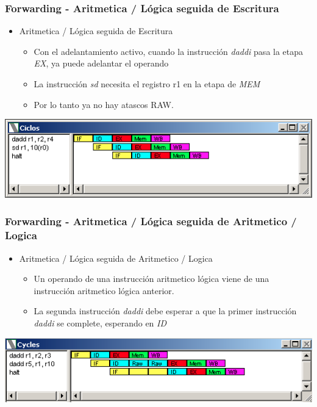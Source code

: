 \documentclass{beamer}
\begin{document}
\begin{frame}[fragile]
\frametitle{Forwarding - Aritmetica / Lógica seguida de Escritura}
\begin{itemize}
\item Aritmetica / Lógica seguida de Escritura
\begin{itemize}
\item Con el adelantamiento activo, cuando la instrucción \emph{daddi} pasa la etapa \emph{EX}, ya puede adelantar el operando
\item La instrucción \emph{sd} necesita el registro r1 en la etapa de \emph{MEM}
\item Por lo tanto ya no hay atascos RAW.
\end{itemize}
\end{itemize}
\includegraphics[scale=0.45]{forwarding-4-aritmetica-escritura.png}
\end{frame}

\begin{frame}[fragile]
\frametitle{Forwarding - Aritmetica / Lógica seguida de Aritmetico / Logica}
\begin{itemize}
\item Aritmetica / Lógica seguida de Aritmetico / Logica
\begin{itemize}
\item Un operando de una instrucción aritmetico lógica viene de una instrucción aritmetico lógica anterior.
\item La segunda  instrucción \emph{daddi} debe esperar a que la primer instrucción \emph{daddi} se complete, esperando en \emph{ID}
\end{itemize}
\end{itemize}
\includegraphics[scale=0.45]{forwarding-5.png}
\end{frame}
\end{document}
